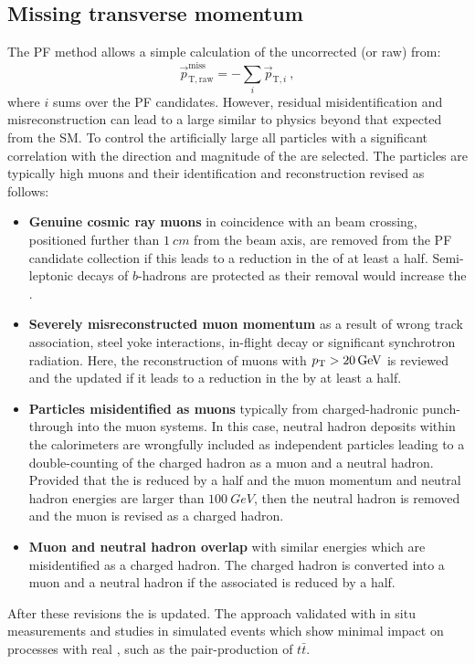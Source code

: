 \subsection{Missing transverse momentum}

The PF method allows a simple calculation of the uncorrected (or raw) \ptmiss from:
%
\begin{equation}
    \vec{p}_{\mathrm{T,raw}}^{\mathrm{miss}} = - \sum_{i} \vec{p}_{\mathrm{T},i}\ ,
\end{equation}
%
where $i$ sums over the PF candidates. However, residual misidentification and misreconstruction can lead to a large \ptmiss similar to physics beyond that expected from the SM. To control the artificially large \ptmiss all particles with a significant correlation with the direction and magnitude of the \ptmiss are selected. The particles are typically high \pt muons and their identification and reconstruction revised as follows:
%
\begin{itemize}
    \item \textbf{Genuine cosmic ray muons} in coincidence with an \LHC beam crossing, positioned further than ${\SI{1}{cm}}$ from the beam axis, are removed from the PF candidate collection if this leads to a reduction in the \ptmiss of at least a half. Semi-leptonic decays of $b$-hadrons are protected as their removal would increase the \ptmiss.
    \item \textbf{Severely misreconstructed muon momentum} as a result of wrong track association, steel yoke interactions, in-flight decay or significant synchrotron radiation. Here, the reconstruction of muons with ${p_{\text{T}}>\SI{20}{GeV}}$ is reviewed and the \pt updated if it leads to a reduction in the \ptmiss by at least a half.
    \item \textbf{Particles misidentified as muons} typically from charged-hadronic punch-through into the muon systems. In this case, neutral hadron deposits within the calorimeters are wrongfully included as independent particles leading to a double-counting of the charged hadron as a muon and a neutral hadron. Provided that the \ptmiss is reduced by a half and the muon momentum and neutral hadron energies are larger than ${\SI{100}{GeV}}$, then the neutral hadron is removed and the muon is revised as a charged hadron.
    \item \textbf{Muon and neutral hadron overlap} with similar energies which are misidentified as a charged hadron. The charged hadron is converted into a muon and a neutral hadron if the associated \ptmiss is reduced by a half.
\end{itemize}
%
After these revisions the \ptmiss is updated. The approach validated with in situ measurements and studies in simulated events which show minimal impact on processes with real \ptmiss, such as the pair-production of $t\bar{t}$.


